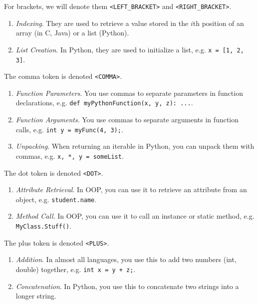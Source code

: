   \begin{example}[Brackets]
    \label{ex:brackets}
    For brackets, we will denote them \texttt{<LEFT\_BRACKET>} and \texttt{<RIGHT\_BRACKET>}.
    \begin{enumerate}
      \item \textit{Indexing}. They are used to retrieve a value stored in the $i$th position of an array (in C, Java) or a list (Python). 
      \item \textit{List Creation}. In Python, they are used to initialize a list, e.g. \texttt{x = [1, 2, 3]}.
    \end{enumerate}
  \end{example}

  \begin{example}[Comma]
    \label{ex:comma}
    The comma token is denoted \texttt{<COMMA>}. 
    \begin{enumerate}
      \item \textit{Function Parameters}. You use commas to separate parameters in function declarations, e.g. \texttt{def myPythonFunction(x, y, z): ...}.
      \item \textit{Function Arguments}. You use commas to separate arguments in function calls, e.g. \texttt{int y = myFunc(4, 3);}.
      \item \textit{Unpacking}. When returning an iterable in Python, you can unpack them with commas, e.g. \texttt{x, *, y = someList}.
    \end{enumerate}
  \end{example}
  
  \begin{example}[Dot]
    \label{ex:dot}
    The dot token is denoted \texttt{<DOT>}. 
    \begin{enumerate}
      \item \textit{Attribute Retrieval}. In OOP, you can use it to retrieve an attribute from an object, e.g. \texttt{student.name}.
      \item \textit{Method Call}. In OOP, you can use it to call an instance or static method, e.g. \texttt{MyClass.Stuff()}.
    \end{enumerate}
  \end{example}

  \begin{example}[Plus]
    \label{ex:plus}
    The plus token is denoted \texttt{<PLUS>}. 
    \begin{enumerate}
      \item \textit{Addition}. In almost all languages, you use this to add two numbers (int, double) together, e.g. \texttt{int x = y + z;}. 
      \item \textit{Concatenation}. In Python, you use this to concatenate two strings into a longer string. 
    \end{enumerate}
  \end{example}

